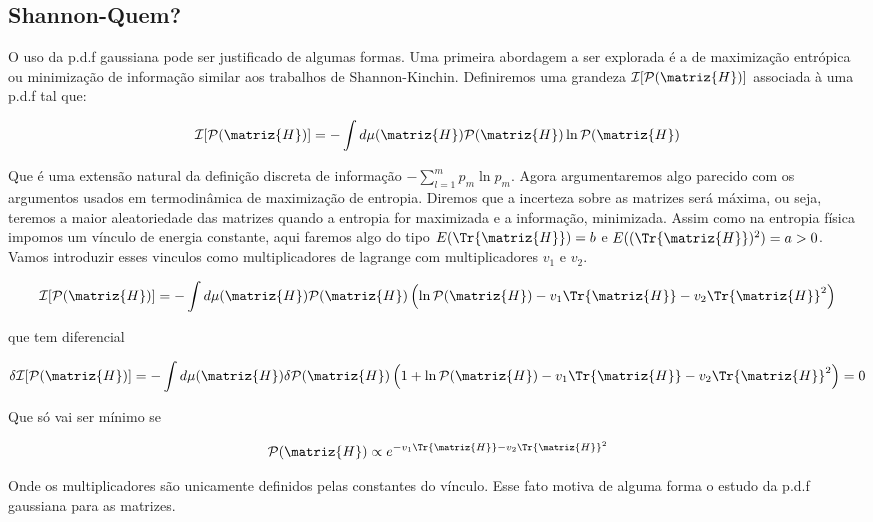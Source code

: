 \subsection{Shannon-Quem?}

O uso da p.d.f gaussiana pode ser justificado de algumas formas. Uma primeira abordagem a ser explorada é a de maximização entrópica ou minimização de informação similar aos trabalhos de Shannon-Kinchin. Definiremos uma grandeza $\mathcal{I}[\mathcal{P}(\matriz{H})]$ associada à uma p.d.f tal que:

\[
	\mathcal{I}[\mathcal{P}(\matriz{H})] = - \int d\mu (\matriz{H}) \mathcal{P}(\matriz{H}) \ln{\mathcal{P}(\matriz{H})} 		
\]

Que é uma extensão natural da definição discreta de informação $- \sum_{l=1}^{m} p_m \ln{p_m}$. Agora argumentaremos algo parecido com os argumentos usados em termodinâmica de maximização de entropia. Diremos que a incerteza sobre as matrizes será máxima, ou seja, teremos a maior aleatoriedade das matrizes quando a entropia for maximizada e a informação, minimizada. Assim como na entropia física impomos um vínculo de energia constante, aqui faremos algo do tipo $E(\Tr{\matriz{H}}) = b$ e $E((\Tr{\matriz{H}})^2) = a > 0$. Vamos introduzir esses vinculos como multiplicadores de lagrange com multiplicadores $v_1$ e $v_2$. 

\[
	\mathcal{I}[\mathcal{P}(\matriz{H})] = - \int d\mu (\matriz{H}) \mathcal{P}(\matriz{H}) \left( \ln{\mathcal{P}(\matriz{H})} - v_1 \Tr{\matriz{H}} - v_2 \Tr{\matriz{H}}^2 \right)	
\]	

que tem diferencial

\[
\delta \mathcal{I}[\mathcal{P}(\matriz{H})] = - \int d\mu (\matriz{H})  \delta \mathcal{P}(\matriz{H}) \left( 1 + \ln{\mathcal{P}(\matriz{H})} - v_1 \Tr{\matriz{H}} - v_2 \Tr{\matriz{H}}^2 \right)	= 0
\]

Que só vai ser mínimo se 

\[
	\mathcal{P}(\matriz{H}) \propto e^{ - v_1 \Tr{\matriz{H}} - v_2 \Tr{\matriz{H}}^2}
\]

Onde os multiplicadores são unicamente definidos pelas constantes do vínculo. Esse fato motiva de alguma forma o estudo da p.d.f gaussiana para as matrizes.
